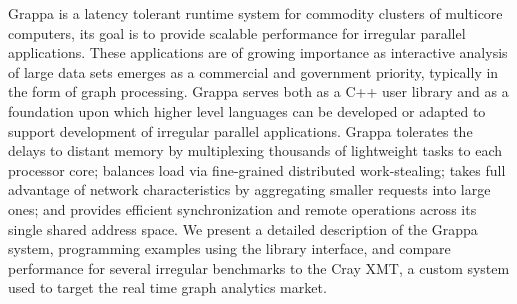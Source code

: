Grappa is a latency tolerant runtime system for commodity clusters of
multicore computers, its goal is to provide scalable performance for irregular
parallel applications. These applications are of growing importance as
interactive analysis of large data sets emerges as a commercial and government
priority, typically in the form of graph processing. Grappa serves both as a
C++ user library and as a foundation upon which higher level languages can be
developed or adapted to support development of irregular parallel
applications. Grappa tolerates the delays to distant memory by multiplexing
thousands of lightweight tasks to each processor core; balances load via
fine-grained distributed work-stealing; takes full advantage of network
characteristics by aggregating smaller requests into large ones; and provides
efficient synchronization and remote operations across its single shared
address space. We present a detailed description of the Grappa system,
programming examples using the library interface, and compare performance for
several irregular benchmarks to the Cray XMT, a custom system used to target
the real time graph analytics market.